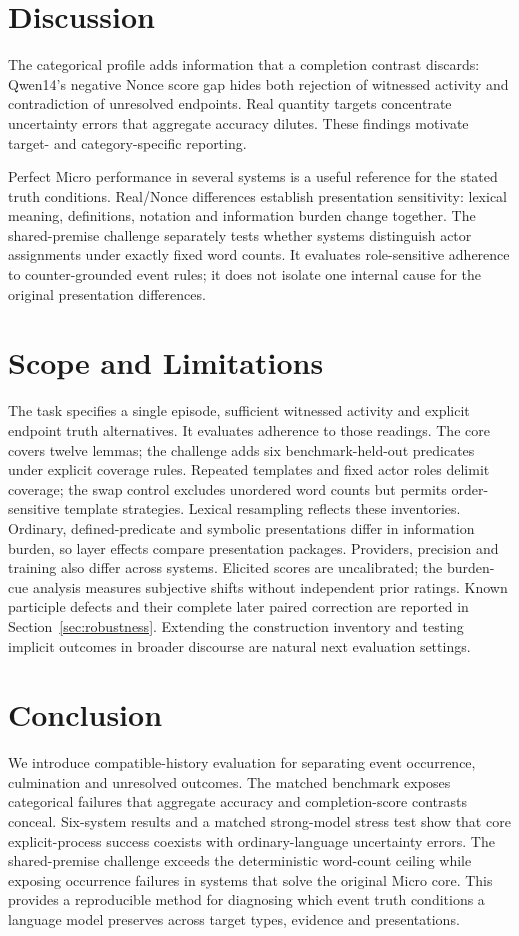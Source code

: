 \documentclass[sigconf,anonymous,review]{acmart}
\begin{document}
\section{Discussion}
The categorical profile adds information that a completion contrast discards: Qwen14's negative Nonce score gap hides both rejection of witnessed activity and contradiction of unresolved endpoints. Real quantity targets concentrate uncertainty errors that aggregate accuracy dilutes. These findings motivate target- and category-specific reporting.

Perfect Micro performance in several systems is a useful reference for the stated truth conditions. Real/Nonce differences establish presentation sensitivity: lexical meaning, definitions, notation and information burden change together. The shared-premise challenge separately tests whether systems distinguish actor assignments under exactly fixed word counts. It evaluates role-sensitive adherence to counter-grounded event rules; it does not isolate one internal cause for the original presentation differences.

\balance
\section{Scope and Limitations}
The task specifies a single episode, sufficient witnessed activity and explicit endpoint truth alternatives. It evaluates adherence to those readings. The core covers twelve lemmas; the challenge adds six benchmark-held-out predicates under explicit coverage rules. Repeated templates and fixed actor roles delimit coverage; the swap control excludes unordered word counts but permits order-sensitive template strategies. Lexical resampling reflects these inventories. Ordinary, defined-predicate and symbolic presentations differ in information burden, so layer effects compare presentation packages. Providers, precision and training also differ across systems. Elicited scores are uncalibrated; the burden-cue analysis measures subjective shifts without independent prior ratings. Known participle defects and their complete later paired correction are reported in Section~\ref{sec:robustness}. Extending the construction inventory and testing implicit outcomes in broader discourse are natural next evaluation settings.

\section{Conclusion}
We introduce compatible-history evaluation for separating event occurrence, culmination and unresolved outcomes. The matched benchmark exposes categorical failures that aggregate accuracy and completion-score contrasts conceal. Six-system results and a matched strong-model stress test show that core explicit-process success coexists with ordinary-language uncertainty errors. The shared-premise challenge exceeds the deterministic word-count ceiling while exposing occurrence failures in systems that solve the original Micro core. This provides a reproducible method for diagnosing which event truth conditions a language model preserves across target types, evidence and presentations.
\end{document}
